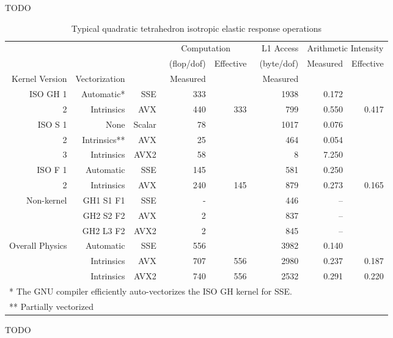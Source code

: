 \documentclass[]             %
{NASA}                       %
\begin{document}
TODO

\begin{table}[ht]%
\caption{Typical quadratic tetrahedron isotropic elastic response operations}
\label{tab:kern-iso-tet10}
\begin{tabular}{rrrrrrrr}
\toprule
& & & \multicolumn{2}{c}{Computation} & L1 Access & \multicolumn{2}{c}{Arithmetic Intensity}\\
& & &~(flop/dof) & Effective &~(byte/dof) & Measured & Effective\\
\cmidrule(lr){4-5}\cmidrule(lr){8-8}
Kernel Version & Vectorization & & Measured & & Measured &  & \\
\midrule
ISO GH 1 & Automatic* & SSE & 333 & & 1938 & 0.172 & \\
2 & Intrinsics & AVX & 440 & 333 & 799 & 0.550 & 0.417\\
\midrule
ISO S 1 & None & Scalar & 78 & & 1017 & 0.076 & \\
2 & Intrinsics** & AVX & 25 &  & 464 & 0.054 & \\
3 & Intrinsics & AVX2 & 58 &  & 8 & 7.250 & \\
\midrule
ISO F 1 & Automatic & SSE & 145 & & 581 & 0.250 & \\
2 & Intrinsics & AVX & 240 & 145 & 879 & 0.273 & 0.165\\
\midrule
Non-kernel & GH1 S1 F1 & SSE & - & & 446 & – & \\
& GH2 S2 F2 & AVX & 2 & & 837 & – & \\
& GH2 L3 F2 & AVX2 & 2 & & 845 & – & \\
\cmidrule(lr){1-8}
Overall Physics & Automatic & SSE & 556 &  & 3982 & 0.140 & \\
& Intrinsics & AVX & 707 & 556 & 2980 & 0.237 & 0.187\\
& Intrinsics & AVX2 & 740 & 556 & 2532 & 0.291 & 0.220\\
\bottomrule
\multicolumn{8}{l}{* The GNU compiler efficiently auto-vectorizes the ISO GH kernel for SSE.}\\
\multicolumn{8}{l}{** Partially vectorized}
\end{tabular}
\end{table}

TODO
\end{document}
